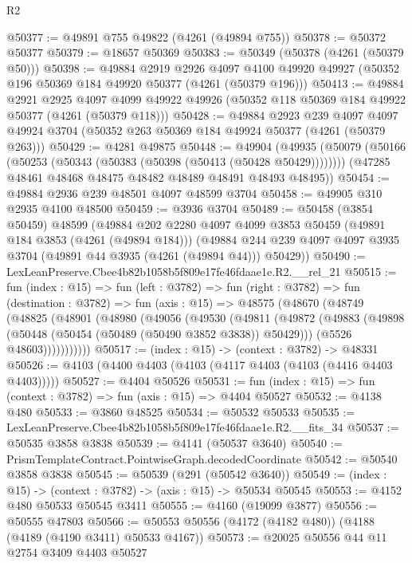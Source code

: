 \begin{lexlean}{R2}
\begin{coremodule}
@50377 := @49891 @755 @49822 (@4261 (@49894 @755))
@50378 := @50372 @50377
@50379 := @18657 @50369
@50383 := @50349 (@50378 (@4261 (@50379 @50)))
@50398 := @49884
    @2919
    @2926
    @4097
    @4100
    @49920
    @49927
    (@50352 @196 @50369 @184 @49920 @50377 (@4261 (@50379 @196)))
@50413 := @49884
    @2921
    @2925
    @4097
    @4099
    @49922
    @49926
    (@50352 @118 @50369 @184 @49922 @50377 (@4261 (@50379 @118)))
@50428 := @49884
    @2923
    @239
    @4097
    @4097
    @49924
    @3704
    (@50352 @263 @50369 @184 @49924 @50377 (@4261 (@50379 @263)))
@50429 := @4281 @49875
@50448 := @49904
    (@49935
      (@50079 (@50166 (@50253 (@50343 (@50383 (@50398 (@50413 (@50428 @50429))))))))
      (@47285 @48461 @48468 @48475 @48482 @48489 @48491 @48493 @48495))
@50454 := @49884 @2936 @239 @48501 @4097 @48599 @3704
@50458 := @49905 @310 @2935 @4100 @48500
@50459 := @3936 @3704
@50489 := @50458
    (@3854 @50459)
    @48599
    (@49884
      @202
      @2280
      @4097
      @4099
      @3853
      @50459
      (@49891 @184 @3853 (@4261 (@49894 @184)))
      (@49884 @244 @239 @4097 @4097 @3935 @3704 (@49891 @44 @3935 (@4261 (@49894 @44))) @50429))
@50490 := LexLeanPreserve.Cbee4b82b1058b5f809e17fe46fdaae1e.R2.__rel_21
@50515 := fun (index : @15) =>
  fun (left : @3782) =>
  fun (right : @3782) =>
  fun (destination : @3782) =>
  fun (axis : @15) =>
  @48575
    (@48670
      (@48749
        (@48825
          (@48901
            (@48980
              (@49056
                (@49530
                  (@49811
                    (@49872
                      (@49883
                        (@49898 (@50448 (@50454 (@50489 (@50490 @3852 @3838)) @50429)))
                        (@5526 @48603)))))))))))
@50517 := (index : @15) -> (context : @3782) -> @48331
@50526 := @4103 (@4400 @4403 (@4103 (@4117 @4403 (@4103 (@4416 @4403 @4403)))))
@50527 := @4404 @50526
@50531 := fun (index : @15) => fun (context : @3782) => fun (axis : @15) => @4404 @50527
@50532 := @4138 @480
@50533 := @3860 @48525
@50534 := @50532 @50533
@50535 := LexLeanPreserve.Cbee4b82b1058b5f809e17fe46fdaae1e.R2.__fits_34
@50537 := @50535 @3858 @3838
@50539 := @4141 (@50537 @3640)
@50540 := PrismTemplateContract.PointwiseGraph.decodedCoordinate
@50542 := @50540 @3858 @3838
@50545 := @50539 (@291 (@50542 @3640))
@50549 := (index : @15) -> (context : @3782) -> (axis : @15) -> @50534 @50545
@50553 := @4152 @480 @50533 @50545 @3411
@50555 := @4160 (@19099 @3877)
@50556 := @50555 @47803
@50566 := @50553 @50556 (@4172 (@4182 @480)) (@4188 (@4189 (@4190 @3411) @50533 @4167))
@50573 := @20025 @50556 @44 @11 @2754 @3409 @4403 @50527

\end{coremodule}
\end{lexlean}
